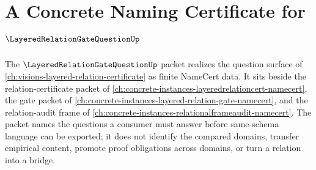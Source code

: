 \chapter{A Concrete Naming Certificate for $\LayeredRelationGateQuestionUp$}
\label{ch:concrete-instances-layered-relation-gate-question-namecert}

The $\LayeredRelationGateQuestionUp$ packet realizes the question surface of \autoref{ch:visions-layered-relation-certificate} as finite NameCert data. It sits beside the relation-certificate packet of \autoref{ch:concrete-instances-layeredrelationcert-namecert}, the gate packet of \autoref{ch:concrete-instances-layered-relation-gate-namecert}, and the relation-audit frame of \autoref{ch:concrete-instances-relationalframeaudit-namecert}. The packet names the questions a consumer must answer before same-schema language can be exported; it does not identify the compared domains, transfer empirical content, promote proof obligations across domains, or turn a relation into a bridge.

